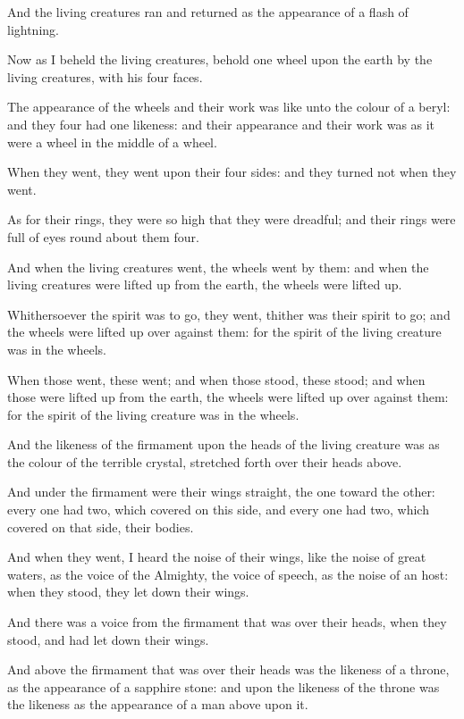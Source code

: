 \verse And the living creatures ran and returned as the appearance of a flash of lightning.

\verse Now as I beheld the living creatures, behold one wheel upon the earth by the living creatures, with his four faces.

\verse The appearance of the wheels and their work was like unto the colour of a beryl: and they four had one likeness: and their appearance and their work was as it were a wheel in the middle of a wheel.

\verse When they went, they went upon their four sides: and they turned not when they went.

\verse As for their rings, they were so high that they were dreadful; and their rings were full of eyes round about them four.

\verse And when the living creatures went, the wheels went by them: and when the living creatures were lifted up from the earth, the wheels were lifted up.

\verse Whithersoever the spirit was to go, they went, thither was their spirit to go; and the wheels were lifted up over against them: for the spirit of the living creature was in the wheels.

\verse When those went, these went; and when those stood, these stood; and when those were lifted up from the earth, the wheels were lifted up over against them: for the spirit of the living creature was in the wheels.

\verse And the likeness of the firmament upon the heads of the living creature was as the colour of the terrible crystal, stretched forth over their heads above.

\verse And under the firmament were their wings straight, the one toward the other: every one had two, which covered on this side, and every one had two, which covered on that side, their bodies.

\verse And when they went, I heard the noise of their wings, like the noise of great waters, as the voice of the Almighty, the voice of speech, as the noise of an host: when they stood, they let down their wings.

\verse And there was a voice from the firmament that was over their heads, when they stood, and had let down their wings.

\verse And above the firmament that was over their heads was the likeness of a throne, as the appearance of a sapphire stone: and upon the likeness of the throne was the likeness as the appearance of a man above upon it.

